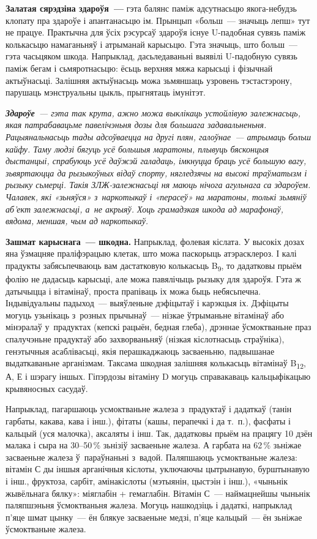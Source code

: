 \textbf{Залатая сярэдзіна здароўя~---} гэта балянс паміж адсутнасьцю якога-небудзь клопату пра здароўе і апантанасьцю ім. Прынцып «больш~--- значыць лепш» тут не працуе. Практычна для ўсіх рэсурсаў здароўя існуе U-падобная сувязь паміж колькасьцю намаганьняў і атрыманай карысьцю. Гэта значыць, што больш~--- гэта часьцяком шкода. Напрыклад, дасьледаваньні выявілі U-падобную сувязь паміж бегам і сьмяротнасьцю: ёсьць верхняя мяжа карысьці і фізычнай актыўнасьці. Залішняя актыўнасьць можа зьмяншаць узровень тэстастэрону, парушаць мэнструальны цыкль, прыгнятаць імунітэт.


\emph{\textbf{Здароўе}~--- гэта так крута, ажно можа выклікаць устойлівую залежнасьць, якая патрабавацьме павелічэньня дозы для большага задавальненьня. Рацыянальнасьць тады адсоўваецца на другі плян, галоўнае~--- атрымаць больш кайфу. Таму людзі бягуць усё большыя маратоны, плывуць бясконцыя дыстанцыі, спрабуюць усё даўжэй галадаць, імкнуцца браць усё большую вагу, зьвяртаюцца да рызыкоўных відаў спорту, нягледзячы на высокі траўматызм і рызыку сьмерці. Такія ЗЛЖ-залежнасьці ня маюць нічога агульнага са здароўем. Чалавек, які «зьняўся» з~наркотыкаў і «перасеў» на маратоны, толькі зьмяніў аб'ект залежнасьці, а~не акрыяў. Хоць грамадзкая шкода ад марафонаў, вядома, меншая, чым ад наркотыкаў.}

\textbf{Зашмат карыснага~--- шкодна.} Напрыклад, фолевая кіслата. У высокіх дозах яна ўзмацняе праліфэрацыю клетак, што можа паскорыць атэрасклероз. І калі прадукты забясьпечваюць вам дастатковую колькасьць B\textsubscript{9}, то дадатковы прыём фолію не дадасьць карысьці, але можа павялічыць рызыку для здароўя. Гэта ж датычыцца і вітамінаў, проста прапіваць іх можа быць небясьпечна. Індывідуальны падыход~--- выяўленьне дэфіцытаў і карэкцыя іх. Дэфіцыты могуць узьнікаць з~розных прычынаў~--- нізкае ўтрыманьне вітамінаў або мінэралаў у~прадуктах (кепскі рацыён, бедная глеба), дрэннае ўсмоктваньне праз спалучэньне прадуктаў або захворваньняў (нізкая кіслотнасьць страўніка), генэтычныя асаблівасьці, якія перашкаджаюць засваеньню, падвышанае выдаткаваньне арганізмам. Таксама шкодная залішняя колькасьць вітамінаў B\textsubscript{12}, А, Е і шэрагу іншых. Гіпэрдозы вітаміну D могуць справакаваць кальцыфікацыю крывяносных сасудаў.

Напрыклад, пагаршаюць усмоктваньне жалеза з~прадуктаў і дадаткаў (танін гарбаты, какава, кава і інш.), фітаты (кашы, перапечкі і да т.~п.), фасфаты і кальцый (уся малочка), аксаляты і інш. Так, дадатковы прыём на працягу 10 дзён малака і сыра на 30--50\,\% зьнізіў засваеньне жалеза. А гарбата на 62\,\% зьніжае засваеньне жалеза ў~параўнаньні з~вадой. Паляпшаюць усмоктваньне жалеза: вітамін С ды іншыя арганічныя кіслоты, уключаючы цытрынавую, бурштынавую і інш., фруктоза, сарбіт, амінакіслоты (мэтыянін, цыстэін і інш.), «чыньнік жывёльнага бялку»: міяглабін + гемаглабін. Вітамін С~--- наймацнейшы чыньнік паляпшэньня ўсмоктваньня жалеза. Могуць нашкодзіць і дадаткі, напрыклад п'яце шмат цынку~--- ён блякуе засваеньне медзі, п'яце кальцый~--- ён зьніжае ўсмоктваньне жалеза.

